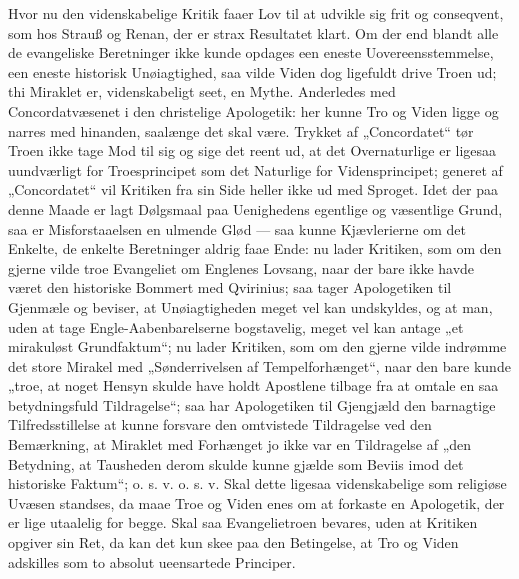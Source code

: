 \documentclass[12pt]{book}
\newcommand{\opage}[1]{\marginnote{\footnotesize\textit{[#1]}}}
\begin{document}
Hvor nu den videnskabelige Kritik faaer Lov til at udvikle
sig frit og conseqvent, som hos Strauß og Renan, der
er strax Resultatet klart. Om der end blandt alle de evangeliske
Beretninger ikke kunde opdages een eneste Uovereensstemmelse,
een eneste historisk Unøiagtighed, saa vilde Viden
dog ligefuldt drive Troen ud; thi Miraklet er, videnskabeligt
seet, en Mythe. Anderledes med Concordatvæsenet i den
christelige Apologetik: her kunne Tro og Viden ligge og
narres med hinanden, saalænge det skal være. Trykket af
„Concordatet“ tør Troen ikke tage Mod til sig og sige det
reent ud, at det Overnaturlige er ligesaa uundværligt for
Troesprincipet som det Naturlige for Vidensprincipet; generet
af „Concordatet“ vil Kritiken fra sin Side heller ikke ud med
Sproget. Idet der paa denne Maade er lagt Dølgsmaal paa
Uenighedens egentlige og væsentlige Grund, saa er Misforstaaelsen
en ulmende Glød --- saa kunne Kjævlerierne om
det Enkelte, de enkelte Beretninger aldrig faae Ende: nu
lader Kritiken, som om den gjerne vilde troe Evangeliet om
Englenes Lovsang, naar der bare ikke havde været den historiske
Bommert med Qvirinius; saa tager Apologetiken til
Gjenmæle og beviser, at Unøiagtigheden meget vel kan undskyldes,
og at man, uden at tage Engle-Aabenbarelserne bogstavelig,
meget vel kan antage „et mirakuløst Grundfaktum“;
nu lader Kritiken, som om den gjerne vilde indrømme det
store Mirakel med „Sønderrivelsen af Tempelforhænget“,
naar den bare kunde „troe, at noget Hensyn skulde have
holdt Apostlene tilbage fra at omtale en saa betydningsfuld
\opage{56}\setcounter{footnote}{0}%
Tildragelse“; saa har Apologetiken til Gjengjæld den barnagtige
Tilfredsstillelse at kunne forsvare den omtvistede Tildragelse %
ved den Bemærkning, at Miraklet med Forhænget
jo ikke var en Tildragelse af „den Betydning, at Tausheden
derom skulde kunne gjælde som Beviis imod det historiske
Faktum“; o. s. v. o. s. v. Skal dette ligesaa videnskabelige
som religiøse Uvæsen standses, da maae Troe og Viden enes
om at forkaste en Apologetik, der er lige utaalelig for begge.
Skal saa Evangelietroen bevares, uden at Kritiken opgiver
sin Ret, da kan det kun skee paa den Betingelse, at Tro og
Viden adskilles som to absolut ueensartede Principer.
\end{document}
